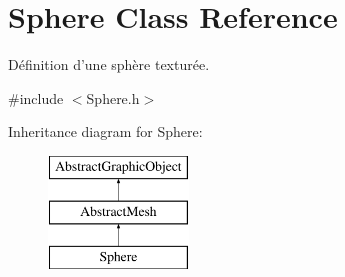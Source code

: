 \hypertarget{classSphere}{\section{Sphere Class Reference}
\label{classSphere}
}


Définition d'une sphère texturée.  




{\ttfamily \#include $<$Sphere.\-h$>$}

Inheritance diagram for Sphere\-:\begin{figure}[H]
\begin{center}
\leavevmode
\includegraphics[height=3.000000cm]{classSphere}
\end{center}
\end{figure}
